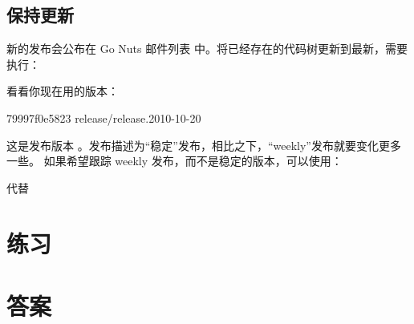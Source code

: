 \subsection{保持更新}
\label{sec:weekly}
新的发布会公布在 Go Nuts 邮件列表 \cite{go_nuts} 中。将已经存在的代码树更新到最新，需要执行：
\begin{display}
\pr {}
\pr {}
\pr {}
\pr {}
\pr {}
\end{display}
\noindent{}看看你现在用的版本：
\begin{display}
\pr {}
\pr {}
79997f0e5823 release/release.2010-10-20
\end{display}
\noindent{}这是发布版本 。发布描述为``稳定''发布，相比之下，``weekly''发布就要变化更多一些。
如果希望跟踪 weekly 发布，而不是稳定的版本，可以使用：
\begin{display}
\pr {}
\end{display}
代替
\begin{display}
\pr {}
\end{display}

\section{练习}


\cleardoublepage
\section{答案}
\shipoutAnswer
